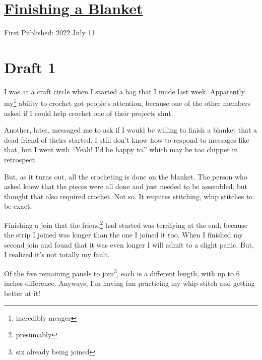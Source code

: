 \documentclass[12pt]{article}[titlepage]
\newcommand{\say}[1]{``#1''}
\newcommand{\1}{\={a}}
\newcommand{\2}{\={e}}
\newcommand{\3}{\={\i}}
\newcommand{\4}{\=o}
\newcommand{\5}{\=u}
\newcommand{\6}{\={A}}
\renewcommand{\,}{\textsuperscript{,}}
\begin{document}
\doublespacing
\section{\href{finishing-a-blanket.html}{Finishing a Blanket}}
First Published: 2022 July 11

\section{Draft 1}
I was at a craft circle when I started a bag that I made last week.
Apparently my\footnote{incredibly meager} ability to crochet got people's attention, because one of the other members asked if I could help crochet one of their projects shut.

Another, later, messaged me to ask if I would be willing to finish a blanket that a dead friend of theirs started.
I still don't know how to respond to messages like that, but I went with \say{Yeah! I'd be happy to.} which may be too chipper in retrospect.

But, as it turns out, all the crocheting is done on the blanket.
The person who asked knew that the pieces were all done and just needed to be assembled, but thought that also required crochet.
Not so.
It requires stitching, whip stitches to be exact.

Finishing a join that the friend\footnote{presumably} had started was terrifying at the end, because the strip I joined was longer than the one I joined it too.
When I finished my second join and found that it was even longer I will admit to a slight panic.
But, I realized it's not totally my fault.

Of the five remaining panels to join\footnote{six already being joined}, each is a different length, with up to 6 inches difference.
Anyways, I'm having fun practicing my whip stitch and getting better at it!
\end{document}

